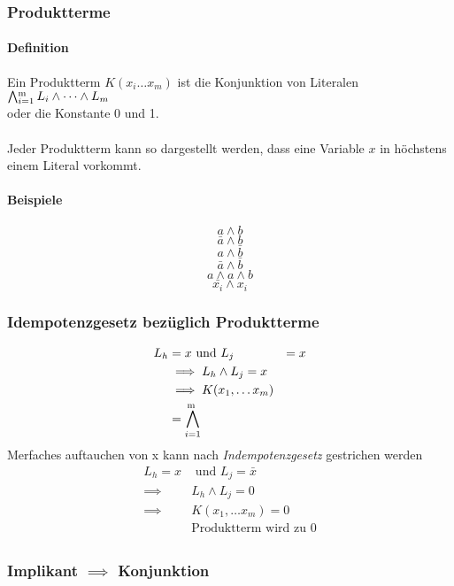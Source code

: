 \documentclass[a4paper]{scrartcl}
\begin{document}
			\subsubsection{Produktterme}
			\paragraph{Definition}
			Ein Produktterm \( K(x_i \dots x_m) \) ist die Konjunktion von Literalen \( \bigwedge^{\raisebox{-0.4ex}{\scriptsize m } }_{i = 1} L_i \wedge \dots \wedge L_m \)\\
			oder die Konstante 0 und 1.\\
			\\
			Jeder Produktterm kann so dargestellt werden, dass eine Variable \( x \) in höchstens einem Literal vorkommt.
			\paragraph{Beispiele}
			\[ a \wedge b \]
			\[ \bar{a} \wedge b \]
			\[ a \wedge \bar{b}  \]
			\[ \bar{a} \wedge \bar{b}  \]
			\[ a \wedge a \wedge b  \]
			\[ \bar{x_i} \wedge x_i \]
			
			\subsubsection{Idempotenzgesetz bezüglich Produktterme}
			\begin{align*}
				L_h &= x \text{ und } L_j &= x\\
				&\implies L_h \wedge L_j = x\\
				&\implies K(x_1, \dots x_m) \\
				&= \bigwedge^{\raisebox{-0.4ex}{\scriptsize m } }_{i = 1}\\
			\end{align*}
			Merfaches auftauchen von x kann nach \emph{Indempotenzgesetz} gestrichen werden\\
			
			\begin{align*}
			L_h = x &\text{ und } L_j = \bar{x}\\
			\implies & L_h \wedge L_j = 0 \\
			\implies & K(x_1, \dots x_m) = 0\\
			& \text{Produktterm wird zu 0}\\	
			\end{align*}
			
			\subsubsection{Implikant \( \implies \) Konjunktion }
\end{document}
